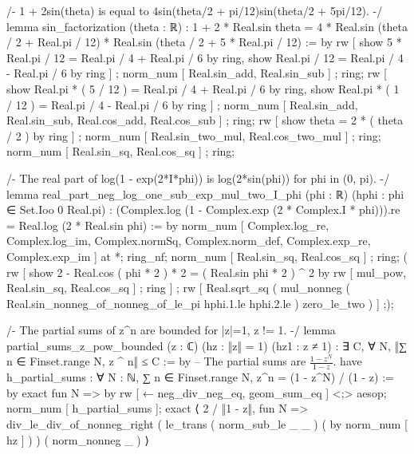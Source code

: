/-
1 + 2sin(theta) is equal to 4sin(theta/2 + pi/12)sin(theta/2 + 5pi/12).
-/
lemma sin_factorization (theta : ℝ) :
  1 + 2 * Real.sin theta = 4 * Real.sin (theta / 2 + Real.pi / 12) * Real.sin (theta / 2 + 5 * Real.pi / 12) := by
    rw [ show 5 * Real.pi / 12 = Real.pi / 4 + Real.pi / 6 by ring, show Real.pi / 12 = Real.pi / 4 - Real.pi / 6 by ring ] ; norm_num [ Real.sin_add, Real.sin_sub ] ; ring;
    rw [ show Real.pi * ( 5 / 12 ) = Real.pi / 4 + Real.pi / 6 by ring, show Real.pi * ( 1 / 12 ) = Real.pi / 4 - Real.pi / 6 by ring ] ; norm_num [ Real.sin_add, Real.sin_sub, Real.cos_add, Real.cos_sub ] ; ring;
    rw [ show theta = 2 * ( theta / 2 ) by ring ] ; norm_num [ Real.sin_two_mul, Real.cos_two_mul ] ; ring; norm_num [ Real.sin_sq, Real.cos_sq ] ; ring;

/-
The real part of log(1 - exp(2*I*phi)) is log(2*sin(phi)) for phi in (0, pi).
-/
lemma real_part_neg_log_one_sub_exp_mul_two_I_phi (phi : ℝ) (hphi : phi ∈ Set.Ioo 0 Real.pi) :
  (Complex.log (1 - Complex.exp (2 * Complex.I * phi))).re = Real.log (2 * Real.sin phi) := by
    norm_num [ Complex.log_re, Complex.log_im, Complex.normSq, Complex.norm_def, Complex.exp_re, Complex.exp_im ] at *;
    ring_nf; norm_num [ Real.sin_sq, Real.cos_sq ] ; ring; (
    rw [ show 2 - Real.cos ( phi * 2 ) * 2 = ( Real.sin phi * 2 ) ^ 2 by rw [ mul_pow, Real.sin_sq, Real.cos_sq ] ; ring ] ; rw [ Real.sqrt_sq ( mul_nonneg ( Real.sin_nonneg_of_nonneg_of_le_pi hphi.1.le hphi.2.le ) zero_le_two ) ] ;);

/-
The partial sums of z^n are bounded for |z|=1, z != 1.
-/
lemma partial_sums_z_pow_bounded (z : ℂ) (hz : ‖z‖ = 1) (hz1 : z ≠ 1) :
  ∃ C, ∀ N, ‖∑ n ∈ Finset.range N, z ^ n‖ ≤ C := by
    -- The partial sums are $\frac{1-z^N}{1-z}$.
    have h_partial_sums : ∀ N : ℕ, ∑ n ∈ Finset.range N, z^n = (1 - z^N) / (1 - z) := by
      exact fun N => by rw [ ← neg_div_neg_eq, geom_sum_eq ] <;> aesop;
    norm_num [ h_partial_sums ];
    exact ⟨ 2 / ‖1 - z‖, fun N => div_le_div_of_nonneg_right ( le_trans ( norm_sub_le _ _ ) ( by norm_num [ hz ] ) ) ( norm_nonneg _ ) ⟩

